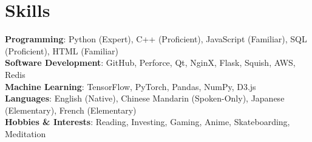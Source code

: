 \section{Skills}
 \begin{itemize}[leftmargin=0.5cm, label={}]
    \small{\item{
     \textbf{Programming}{: Python (Expert), C++ (Proficient), JavaScript (Familiar), SQL (Proficient), HTML (Familiar)} \\
     \textbf{Software Development}{: GitHub, Perforce, Qt, NginX, Flask, Squish, AWS, Redis} \\
     \textbf{Machine Learning}{: TensorFlow, PyTorch, Pandas, NumPy, D3.js} \\
     \textbf{Languages}{: English (Native), Chinese Mandarin (Spoken-Only), Japanese (Elementary), French (Elementary)} \\
     \textbf{Hobbies \& Interests}{: Reading, Investing, Gaming, Anime, Skateboarding, Meditation} \\
    }}
 \end{itemize}